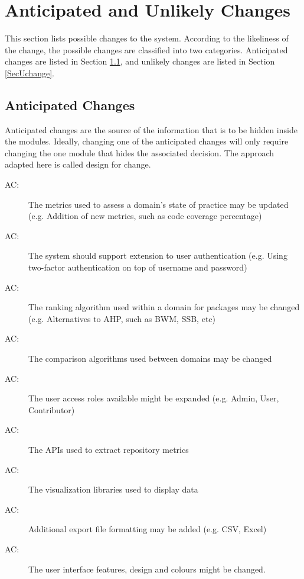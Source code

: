 \documentclass[12pt, titlepage]{article}
\newcounter{acnum}
\newcommand{\actheacnum}{AC\theacnum}
\begin{document}
\section{Anticipated and Unlikely Changes} \label{SecChange}

This section lists possible changes to the system. According to the likeliness
of the change, the possible changes are classified into two
categories. Anticipated changes are listed in Section \ref{SecAchange}, and
unlikely changes are listed in Section \ref{SecUchange}.

\subsection{Anticipated Changes} \label{SecAchange}

Anticipated changes are the source of the information that is to be hidden
inside the modules. Ideally, changing one of the anticipated changes will only
require changing the one module that hides the associated decision. The approach
adapted here is called design for
change.

\begin{description}
  \item[ \actheacnum \label{ac1}:] The metrics used to assess a domain's state of practice may be updated (e.g. Addition of new metrics, such as code coverage percentage)
  \item[ \actheacnum \label{ac2}:] The system should support extension to user authentication (e.g. Using two-factor authentication on top of username and password)
  \item[ \actheacnum \label{ac3}:] The ranking algorithm used within a domain for packages may be changed (e.g. Alternatives to AHP, such as BWM, SSB, etc)
  \item[ \actheacnum \label{ac4}:] The comparison algorithms used between domains may be changed
  \item[ \actheacnum \label{ac5}:] The user access roles available might be expanded (e.g. Admin, User, Contributor)
  \item[ \actheacnum \label{ac6}:] The APIs used to extract repository metrics
  \item[ \actheacnum \label{ac7}:] The visualization libraries used to display data
  \item[ \actheacnum \label{ac8}:] Additional export file formatting may be added (e.g. CSV, Excel)
  \item[ \actheacnum \label{ac9}:] The user interface features, design and colours might be changed.
\end{description}
\end{document}
